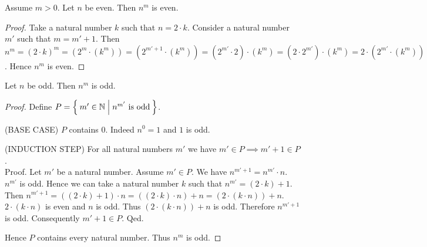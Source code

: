 \documentclass[../../arithmetic.tex]{subfiles}
\begin{document}
  \begin{forthel}
    \begin{proposition}\label{Arithmetic_03_07_192104}
      Assume $m > 0$.
      Let $n$ be even.
      Then $n^{m}$ is even.
    \end{proposition}
    \begin{proof}
      Take a natural number $k$ such that $n = 2 \cdot k$.
      Consider a natural number $m'$ such that $m = m' + 1$.
      Then $n^{m} =
      (2 \cdot k)^{m} =
      (2^{m} \cdot (k^{m})) =
      (2^{m' + 1} \cdot (k^{m})) =
      (2^{m'} \cdot 2) \cdot (k^{m}) =
      (2 \cdot 2^{m'}) \cdot (k^{m}) =
      2 \cdot (2^{m'} \cdot (k^{m}))$.
      Hence $n^{m}$ is even.
    \end{proof}

    \begin{proposition}\label{Arithmetic_03_07_330205}
      Let $n$ be odd.
      Then $n^{m}$ is odd.
    \end{proposition}
    \begin{proof}
      Define $P = \Set{m' \in \mathbb{N} | \text{$n^{m'}$ is odd}}$.

      (BASE CASE) $P$ contains $0$.
      Indeed $n^{0} = 1$ and $1$ is odd.

      (INDUCTION STEP) For all natural numbers $m'$ we have $m' \in P \implies m' + 1 \in P$. \\
      Proof.
        Let $m'$ be a natural number.
        Assume $m' \in P$.
        We have $n^{m' + 1} = n^{m'} \cdot n$.
        $n^{m'}$ is odd.
        Hence we can take a natural number $k$ such that $n^{m'} = (2 \cdot k) + 1$.
        Then $n^{m' + 1} =
        ((2 \cdot k) + 1) \cdot n =
        ((2 \cdot k) \cdot n) + n =
        (2 \cdot (k \cdot n)) + n$.
        $2 \cdot (k \cdot n)$ is even and $n$ is odd.
        Thus $(2 \cdot (k \cdot n)) + n$ is odd.
        Therefore $n^{m' + 1}$ is odd.
        Consequently $m' + 1 \in P$.
      Qed.

      Hence $P$ contains every natural number.
      Thus $n^{m}$ is odd.
    \end{proof}
  \end{forthel}
\end{document}
